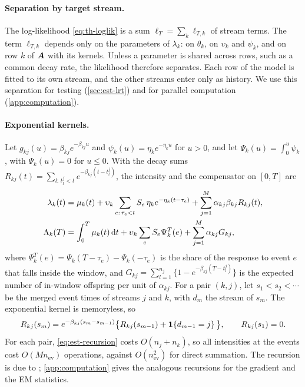 \paragraph{Separation by target stream.} The log-likelihood \eqref{eq:th-loglik} is a sum
$\ell_T=\sum_k\ell_{T,k}$ of stream terms. The term $\ell_{T,k}$ depends only on the
parameters of $\lambda_k$: on $\theta_k$, on $\upsilon_k$ and $\psi_k$, and on row $k$ of
$\bm{A}$ with its kernels. Unless a parameter is shared across rows, such as a common decay
rate, the likelihood therefore separates. Each row of the model is fitted to its own
stream, and the other streams enter only as history. We use this separation for testing
(\cref{sec:est-lrt}) and for parallel computation (\cref{app:computation}).

\paragraph{Exponential kernels.} Let $g_{kj}(u)=\beta_{kj}e^{-\beta_{kj}u}$ and
$\psi_k(u)=\eta_ke^{-\eta_ku}$ for $u>0$, and let $\Psi_k(u)=\int_0^u\psi_k$, with
$\Psi_k(u)=0$ for $u\le0$. With the decay sums
$R_{kj}(t)=\sum_{l:\,t^j_l<t}e^{-\beta_{kj}(t-t^j_l)}$, the intensity and the compensator
on $[0,T]$ are
\begin{align}
  \lambda_k(t)&=\mu_k(t)+\upsilon_k\sum_{e:\,\tau_e<t}S_e\,\eta_ke^{-\eta_k(t-\tau_e)}
  +\sum_{j=1}^M\alpha_{kj}\beta_{kj}R_{kj}(t),\label{eq:est-lambda}\\
  \Lambda_k(T)&=\int_0^T\mu_k(t)\,\mathrm{d} t+\upsilon_k\sum_eS_e\Psi_k^T(e)
  +\sum_{j=1}^M\alpha_{kj}G_{kj},\label{eq:est-comp}
\end{align}
where $\Psi^T_k(e)=\Psi_k(T-\tau_e)-\Psi_k(-\tau_e)$ is the share of the response to
event $e$ that falls inside the window, and
$G_{kj}=\sum_{l=1}^{n_j}\{1-e^{-\beta_{kj}(T-t^j_l)}\}$ is the expected number of in-window
offspring per unit of $\alpha_{kj}$. For a pair $(k,j)$, let $s_1<s_2<\cdots$ be the
merged event times of streams $j$ and $k$, with $d_m$ the stream of $s_m$. The exponential
kernel is memoryless, so
\begin{equation}\label{eq:est-recursion}
  R_{kj}(s_m)=e^{-\beta_{kj}(s_m-s_{m-1})}\big\{R_{kj}(s_{m-1})+\mathbf{1}\!\left\{d_{m-1}=j\right\}\big\},
  \qquad R_{kj}(s_1)=0 .
\end{equation}
For each pair, \eqref{eq:est-recursion} costs $O(n_j+n_k)$, so all intensities at the
events cost $O(Mn_{\mathrm{ev}})$ operations, against $O(n_{\mathrm{ev}}^2)$ for direct
summation. The recursion is due to \citet{ozaki1979}; \cref{app:computation} gives the
analogous recursions for the gradient and the EM statistics.

